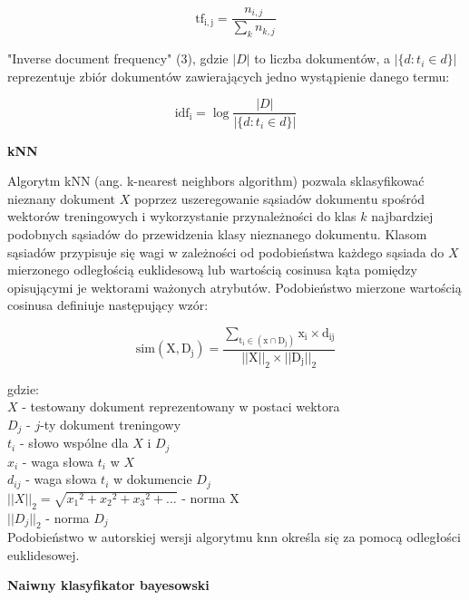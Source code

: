 \documentclass[a4paper, 10pt]{article}
\begin{document}
\begin{equation}
\mathrm{tf_{i,j}} = \frac{n_{i,j}}{\sum_k n_{k,j}}
\end{equation}

"Inverse document frequency" (3), gdzie $|D|$ to liczba dokumentów, a $|\{d : t_{i} \in d\}|$ reprezentuje zbiór dokumentów zawierających
jedno wystąpienie danego termu:

\begin{equation}
\mathrm{idf_{i}} =  \log \frac{|D|}{|\{d: t_{i} \in d\}|}
\end{equation}



{\bf{kNN}}

Algorytm kNN (ang. k-nearest neighbors algorithm) pozwala sklasyfikować nieznany dokument $X$  poprzez uszeregowanie sąsiadów dokumentu spośród wektorów treningowych i 
wykorzystanie przynależności do klas $k$ najbardziej podobnych sąsiadów do przewidzenia klasy nieznanego dokumentu. Klasom sąsiadów przypisuje się wagi w zależności od 
podobieństwa każdego sąsiada do $X$ mierzonego odległością euklidesową lub wartością cosinusa kąta pomiędzy opisującymi je wektorami ważonych atrybutów. 
Podobieństwo mierzone wartością cosinusa definiuje następujący wzór:

\begin{equation}
\mathrm{sim(X, D_{j}) = \frac{
\sum_{ t_{i} \in (x\cap D_{j})
  }x_{i} \times d_{ij}}{||X||_{2} \times ||D_{j}||_{2}}}
\end{equation}

gdzie:\\
$X$ - testowany dokument reprezentowany w postaci wektora\\
$D_{j}$ - $j$-ty dokument treningowy\\
$t_{i}$ - słowo wspólne dla $X$ i $D_{j}$\\
$x_{i}$ - waga słowa $t_{i}$ w $X$\\
$d_{ij}$ - waga słowa $t_{i}$ w dokumencie $D_{j}$\\
$||X||_{2} = \sqrt{{x_{1}}^{2} + {x_{2}}^{2} + {x_{3}}^{2} + ...}$ - norma X\\
$||D_{j}||_{2}$ - norma $D_{j}$\\

Podobieństwo w autorskiej wersji algorytmu knn określa się za pomocą odległości euklidesowej.



{\bf{Naiwny klasyfikator bayesowski}}
\end{document}
